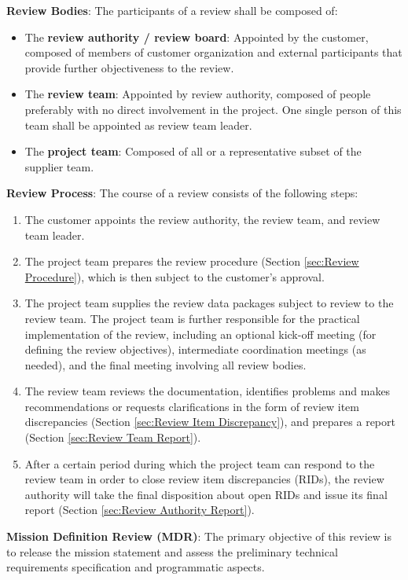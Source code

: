 \textbf{Review Bodies}: The participants of a review shall be composed of:
\begin{itemize}
\item The \textbf{review authority / review board}: Appointed by the customer, composed of members of customer organization and external participants that provide further objectiveness to the review.
\item The \textbf{review team}: Appointed by review authority, composed of people preferably with no direct involvement in the project. One single person of this team shall be appointed as review team leader.
\item The \textbf{project team}: Composed of all or a representative subset of the supplier team.
\end{itemize}

\textbf{Review Process}: The course of a review consists of the following steps:
\begin{enumerate}
\item The customer appoints the review authority, the review team, and review team leader.
\item The project team prepares the review procedure (Section \ref{sec:Review Procedure}), which is then subject to the customer's approval.
\item The project team supplies the review data packages subject to review to the review team. The project team is further responsible for the practical implementation of the review, including an optional kick-off meeting (for defining the review objectives), intermediate coordination meetings (as needed), and the final meeting involving all review bodies.
\item The review team reviews the documentation, identifies problems and makes recommendations or requests clarifications in the form of review item discrepancies (Section \ref{sec:Review Item Discrepancy}), and prepares a report (Section \ref{sec:Review Team Report}). 
\item After a certain period during which the project team can respond to the review team in order to close review item discrepancies (RIDs), the review authority will take the final disposition about open RIDs and issue its final report (Section \ref{sec:Review Authority Report}).
\end{enumerate}

\textbf{Mission Definition Review (MDR)}: The primary objective of this review is to release the mission statement and assess the preliminary technical requirements specification and programmatic aspects.

